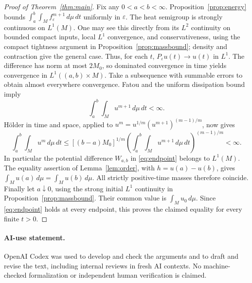 \documentclass[11pt]{article}
\theoremstyle{definition}
\theoremstyle{remark}
\newcommand{\dd}{\,d\mu}
\newcommand{\intM}{\int_M}
\begin{document}
\begin{proof}[Proof of Theorem~\ref{thm:main}]
Fix any \(0<a<b<\infty\). Proposition~\ref{prop:energy} bounds
\(\int_a^b\intM f_\varepsilon^{m+1}\dd\,dt\) uniformly
in \(\varepsilon\). The heat semigroup is strongly continuous
on \(L^1(M)\). One may see this directly from its \(L^2\)
continuity on bounded compact inputs, local \(L^1\) convergence,
and conservativeness, using the compact tightness argument in
Proposition~\ref{prop:massbound}; density and contraction give
the general case.
Thus, for each \(t\), \(P_\varepsilon u(t)\to u(t)\) in \(L^1\).
The difference has norm at most \(2M_0\), so dominated convergence
in time yields convergence in \(L^1((a,b)\times M)\).
Take a subsequence with summable errors to obtain almost everywhere
convergence. Fatou and the uniform dissipation bound imply
\[
 \int_a^b\!\intM u^{m+1}\dd\,dt<\infty .
\]
Hölder in time and space, applied to
\(u^m=u^{1/m}(u^{m+1})^{(m-1)/m}\), now gives
\[
 \int_a^b\!\intM u^m\dd\,dt
 \le[(b-a)M_0]^{1/m}
 \left(\int_a^b\!\intM u^{m+1}\dd\,dt\right)^{(m-1)/m}
 <\infty .
\]
In particular the potential difference \(W_{a,b}\) in
\eqref{eq:endpoint} belongs to \(L^1(M)\).
The equality assertion of Lemma~\ref{lem:order}, with
\(h=u(a)-u(b)\), gives
\(\intM u(a)\dd=\intM u(b)\dd\).
All strictly positive-time masses therefore coincide.
Finally let \(a\downarrow0\), using the strong initial
\(L^1\) continuity in Proposition~\ref{prop:massbound}.
Their common value is \(\intM u_0\dd\).
Since \eqref{eq:endpoint} holds at every endpoint, this
proves the claimed equality for every finite \(t>0\).
\end{proof}

\paragraph{AI-use statement.}
OpenAI Codex was used to develop and check the arguments and to draft
and revise the text, including internal reviews in fresh AI contexts.
No machine-checked formalization or independent human verification
is claimed.
\end{document}
